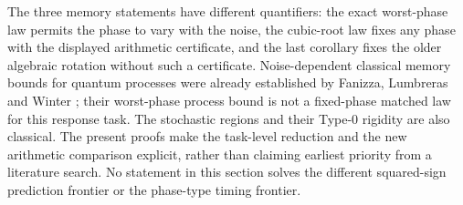 The three memory statements have different quantifiers: the exact worst-phase law permits the phase to vary with the noise, the cubic-root law fixes any phase with the displayed arithmetic certificate, and the last corollary fixes the older algebraic rotation without such a certificate. Noise-dependent classical memory bounds for quantum processes were already established by Fanizza, Lumbreras and Winter \cite{Fanizza24}; their worst-phase process bound is not a fixed-phase matched law for this response task. The stochastic regions and their Type-0 rigidity are also classical. The present proofs make the task-level reduction and the new arithmetic comparison explicit, rather than claiming earliest priority from a literature search. No statement in this section solves the different squared-sign prediction frontier or the phase-type timing frontier.

